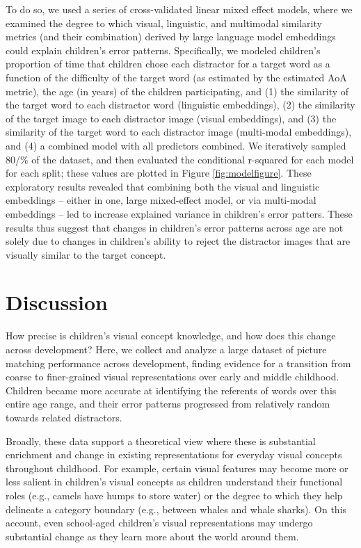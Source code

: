 \documentclass[
  man,floatsintext]{apa6}
\begin{document}
To do so, we used a series of cross-validated linear mixed effect models, where we examined the degree to which visual, linguistic, and multimodal similarity metrics (and their combination) derived by large language model embeddings could explain children's error patterns. Specifically, we modeled children's proportion of time that children chose each distractor for a target word as a function of the difficulty of the target word (as estimated by the estimated AoA metric), the age (in years) of the children participating, and (1) the similarity of the target word to each distractor word (linguistic embeddings), (2) the similarity of the target image to each distractor image (visual embeddings), and (3) the similarity of the target word to each distractor image (multi-modal embeddings), and (4) a combined model with all predictors combined. We iteratively sampled 80/\% of the dataset, and then evaluated the conditional r-squared for each model for each split; these values are plotted in Figure \ref{fig:modelfigure}. These exploratory results revealed that combining both the visual and linguistic embeddings -- either in one, large mixed-effect model, or via multi-modal embeddings -- led to increase explained variance in children's error patters. These results thus suggest that changes in children's error patterns across age are not solely due to changes in children's ability to reject the distractor images that are visually similar to the target concept.

\section{Discussion}\label{discussion}

How precise is children's visual concept knowledge, and how does this change across development? Here, we collect and analyze a large dataset of picture matching performance across development, finding evidence for a transition from coarse to finer-grained visual representations over early and middle childhood. Children became more accurate at identifying the referents of words over this entire age range, and their error patterns progressed from relatively random towards related distractors.

Broadly, these data support a theoretical view where these is substantial enrichment and change in existing representations for everyday visual concepts throughout childhood. For example, certain visual features may become more or less salient in children's visual concepts as children understand their functional roles (e.g., camels have humps to store water) or the degree to which they help delineate a category boundary (e.g., between whales and whale sharks). On this account, even school-aged children's visual representations may undergo substantial change as they learn more about the world around them.
\end{document}
